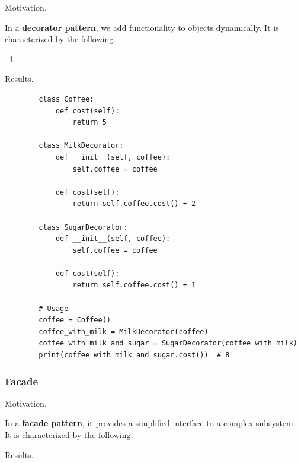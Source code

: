     Motivation. 

    \begin{definition}[Decorator]
      \label{def:decorator}
      In a \textbf{decorator pattern}, we add functionality to objects dynamically. It is characterized by the following. 
      \begin{enumerate}
        \item 
      \end{enumerate}
    \end{definition}

    Results. 

    \begin{example}[Coffee]
      \label{ex:coffee}
      \begin{lstlisting}
        class Coffee:
            def cost(self):
                return 5

        class MilkDecorator:
            def __init__(self, coffee):
                self.coffee = coffee
            
            def cost(self):
                return self.coffee.cost() + 2

        class SugarDecorator:
            def __init__(self, coffee):
                self.coffee = coffee
            
            def cost(self):
                return self.coffee.cost() + 1

        # Usage
        coffee = Coffee()
        coffee_with_milk = MilkDecorator(coffee)
        coffee_with_milk_and_sugar = SugarDecorator(coffee_with_milk)
        print(coffee_with_milk_and_sugar.cost())  # 8 
      \end{lstlisting}
    \end{example}

  \subsubsection{Facade}

    Motivation. 

    \begin{definition}
      \label{def:facade-pattern}
      In a \textbf{facade pattern}, it provides a simplified interface to a complex subsystem. It is characterized by the following. 
    \end{definition}

    Results. 

